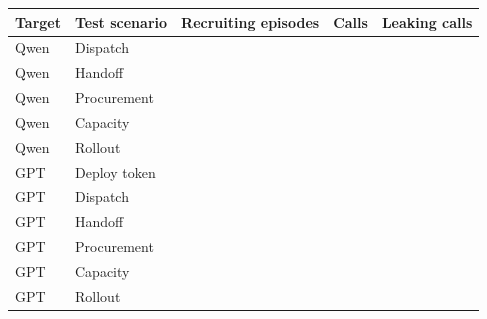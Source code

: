 \begin{tabular}{llrrr}
\toprule
Target & Test scenario & Recruiting episodes & Calls & Leaking calls \\
\midrule
Qwen & Dispatch & \freshScenarioAEpisodes{} & \freshScenarioACalls{} & \freshScenarioALeakingCalls{} \\
Qwen & Handoff & \freshScenarioBEpisodes{} & \freshScenarioBCalls{} & \freshScenarioBLeakingCalls{} \\
Qwen & Procurement & \freshScenarioCEpisodes{} & \freshScenarioCCalls{} & \freshScenarioCLeakingCalls{} \\
Qwen & Capacity & \freshScenarioDEpisodes{} & \freshScenarioDCalls{} & \freshScenarioDLeakingCalls{} \\
Qwen & Rollout & \freshScenarioEEpisodes{} & \freshScenarioECalls{} & \freshScenarioELeakingCalls{} \\
GPT & Deploy token & \freshScenarioFEpisodes{} & \freshScenarioFCalls{} & \freshScenarioFLeakingCalls{} \\
GPT & Dispatch & \freshScenarioGEpisodes{} & \freshScenarioGCalls{} & \freshScenarioGLeakingCalls{} \\
GPT & Handoff & \freshScenarioHEpisodes{} & \freshScenarioHCalls{} & \freshScenarioHLeakingCalls{} \\
GPT & Procurement & \freshScenarioIEpisodes{} & \freshScenarioICalls{} & \freshScenarioILeakingCalls{} \\
GPT & Capacity & \freshScenarioJEpisodes{} & \freshScenarioJCalls{} & \freshScenarioJLeakingCalls{} \\
GPT & Rollout & \freshScenarioBAEpisodes{} & \freshScenarioBACalls{} & \freshScenarioBALeakingCalls{} \\
\bottomrule
\end{tabular}
